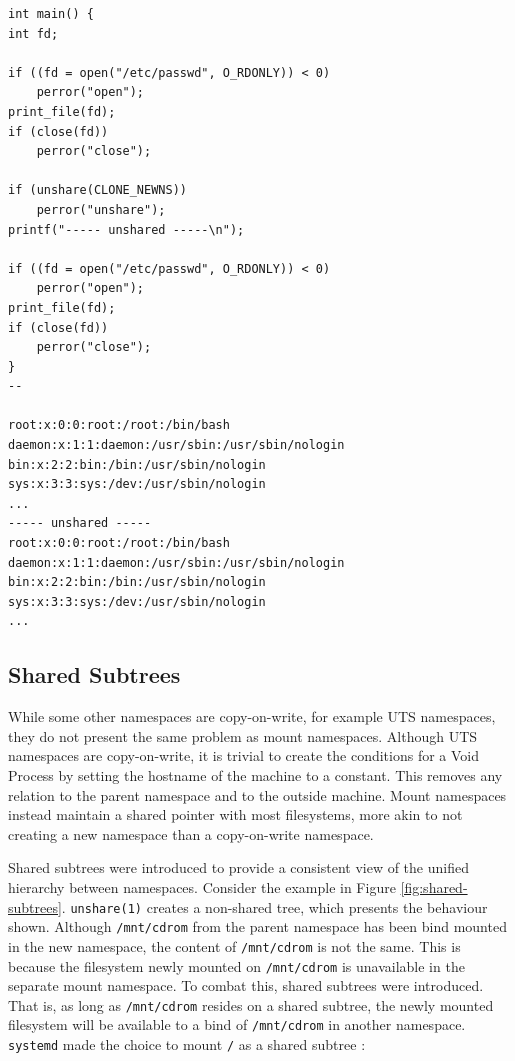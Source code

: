 \documentclass[a4paper,12pt,twoside,openright]{report}
\begin{document}
\begin{lstlisting}[float,label={lst:unshare-cat-passwd}]
int main() {
int fd;

if ((fd = open("/etc/passwd", O_RDONLY)) < 0)
    perror("open");
print_file(fd);
if (close(fd))
    perror("close");

if (unshare(CLONE_NEWNS))
    perror("unshare");
printf("----- unshared -----\n");

if ((fd = open("/etc/passwd", O_RDONLY)) < 0)
    perror("open");
print_file(fd);
if (close(fd))
    perror("close");
}
--

root:x:0:0:root:/root:/bin/bash
daemon:x:1:1:daemon:/usr/sbin:/usr/sbin/nologin
bin:x:2:2:bin:/bin:/usr/sbin/nologin
sys:x:3:3:sys:/dev:/usr/sbin/nologin
...
----- unshared -----
root:x:0:0:root:/root:/bin/bash
daemon:x:1:1:daemon:/usr/sbin:/usr/sbin/nologin
bin:x:2:2:bin:/bin:/usr/sbin/nologin
sys:x:3:3:sys:/dev:/usr/sbin/nologin
...
\end{lstlisting}

\subsection{Shared Subtrees}

While some other namespaces are copy-on-write, for example UTS namespaces, they do not present the same problem as mount namespaces. Although UTS namespaces are copy-on-write, it is trivial to create the conditions for a Void Process by setting the hostname of the machine to a constant. This removes any relation to the parent namespace and to the outside machine. Mount namespaces instead maintain a shared pointer with most filesystems, more akin to not creating a new namespace than a copy-on-write namespace.

Shared subtrees \citep{pai_shared_2005} were introduced to provide a consistent view of the unified hierarchy between namespaces. Consider the example in Figure \ref{fig:shared-subtrees}. \texttt{unshare(1)} creates a non-shared tree, which presents the behaviour shown. Although \texttt{/mnt/cdrom} from the parent namespace has been bind mounted in the new namespace, the content of \texttt{/mnt/cdrom} is not the same. This is because the filesystem newly mounted on \texttt{/mnt/cdrom} is unavailable in the separate mount namespace. To combat this, shared subtrees were introduced. That is, as long as \texttt{/mnt/cdrom} resides on a shared subtree, the newly mounted filesystem will be available to a bind of \texttt{/mnt/cdrom} in another namespace. \texttt{systemd} made the choice to mount \texttt{/} as a shared subtree \citep{free_software_foundation_mount_namespaces7_2021}:
\end{document}
